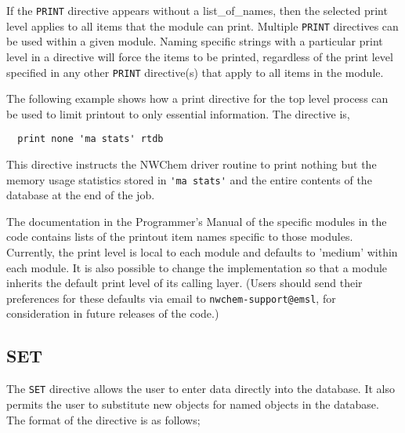 If the \verb+PRINT+ directive appears without a list_of_names, then the
selected print level applies to all items that the module can print.
Multiple \verb+PRINT+ directives can be used within a given module.  Naming
specific strings with a particular print level in a directive will force the
items to be printed, regardless of the print level specified in any other 
\verb+PRINT+ directive(s) that apply to all items in the module.

   

The following example shows how a print directive for the top level process 
can be used to limit printout to only essential information.
The directive is,

\begin{verbatim}
  print none 'ma stats' rtdb
\end{verbatim}

This directive instructs the NWChem driver routine to print nothing but
the memory usage statistics stored in \verb+'ma stats'+ and the entire 
contents of the database at the end of the job. 

The documentation in the Programmer's Manual of the specific modules 
in the code contains lists of the printout item names specific
to those modules.  Currently, the print level is local to each module
and defaults to 'medium' within each module.  It is also possible to
change the implementation so that a module inherits the default print level 
of its calling layer.  (Users should send their preferences for these
defaults via email to \verb+nwchem-support@emsl+, for consideration in
future releases of the code.)

\subsection{SET}
\label{sec:set}

The \verb+SET+ directive allows the user to enter data directly into the
database.  It also permits the user to substitute new objects for named
objects in the database.  The format of the directive is
as follows;

